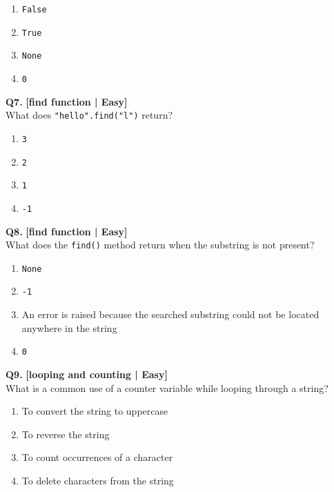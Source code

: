\begin{enumerate}[label=(\alph*),topsep=2pt,itemsep=1pt,partopsep=0pt,parsep=0pt]
    \item \relax \texttt{False}
    \item \relax \texttt{True}
    \item \relax \texttt{None}
    \item \relax \texttt{0}
\end{enumerate}
\vspace{2mm}

\noindent\textbf{Q7.} \hfill {\small\color{LPUOrange}\textbf{[find function | Easy]}}\\[2pt]
What does \texttt{"hello".find("l")} return?

\begin{enumerate}[label=(\alph*),topsep=2pt,itemsep=1pt,partopsep=0pt,parsep=0pt]
    \item \relax \texttt{3}
    \item \relax \texttt{2}
    \item \relax \texttt{1}
    \item \relax \texttt{-1}
\end{enumerate}
\vspace{2mm}

\noindent\textbf{Q8.} \hfill {\small\color{LPUOrange}\textbf{[find function | Easy]}}\\[2pt]
What does the \texttt{find()} method return when the substring is not present?

\begin{enumerate}[label=(\alph*),topsep=2pt,itemsep=1pt,partopsep=0pt,parsep=0pt]
    \item \relax \texttt{None}
    \item \relax \texttt{-1}
    \item \relax An error is raised because the searched substring could not be located anywhere in the string
    \item \relax \texttt{0}
\end{enumerate}
\vspace{2mm}

\noindent\textbf{Q9.} \hfill {\small\color{LPUOrange}\textbf{[looping and counting | Easy]}}\\[2pt]
What is a common use of a counter variable while looping through a string?

\begin{enumerate}[label=(\alph*),topsep=2pt,itemsep=1pt,partopsep=0pt,parsep=0pt]
    \item \relax To convert the string to uppercase
    \item \relax To reverse the string
    \item \relax To count occurrences of a character
    \item \relax To delete characters from the string
\end{enumerate}
\vspace{2mm}


